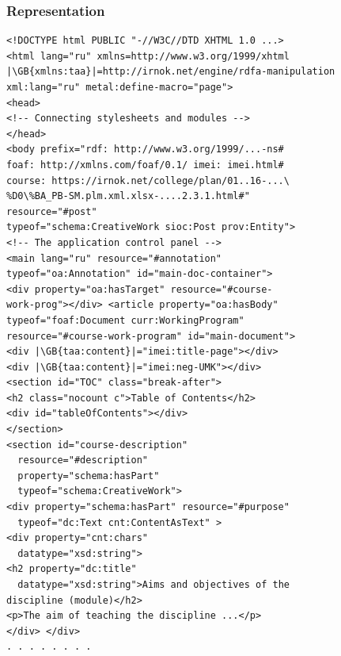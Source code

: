 \documentclass[10pt]{beamer}
\begin{document}
\begin{frame}
  \frametitle{Representation}

\newcommand{\GB}[1]{\colorbox{green}{#1}}
\newcommand{\BB}[1]{\colorbox{blue}{#1}}
\newcommand{\RB}[1]{\colorbox{red}{#1}}

\begin{verbatim}
<!DOCTYPE html PUBLIC "-//W3C//DTD XHTML 1.0 ...>
<html lang="ru" xmlns=http://www.w3.org/1999/xhtml
|\GB{xmlns:taa}|=http://irnok.net/engine/rdfa-manipulation
xml:lang="ru" metal:define-macro="page">
<head>
<!-- Connecting stylesheets and modules -->
</head>
<body prefix="rdf: http://www.w3.org/1999/...-ns#
foaf: http://xmlns.com/foaf/0.1/ imei: imei.html#
course: https://irnok.net/college/plan/01..16-...\
%D0\%BA_PB-SM.plm.xml.xlsx-....2.3.1.html#"
resource="#post"
typeof="schema:CreativeWork sioc:Post prov:Entity">
<!-- The application control panel -->
<main lang="ru" resource="#annotation"
typeof="oa:Annotation" id="main-doc-container">
<div property="oa:hasTarget" resource="#course-
work-prog"></div> <article property="oa:hasBody"
typeof="foaf:Document curr:WorkingProgram"
resource="#course-work-program" id="main-document">
<div |\GB{taa:content}|="imei:title-page"></div>
<div |\GB{taa:content}|="imei:neg-UMK"></div>
<section id="TOC" class="break-after">
<h2 class="nocount c">Table of Contents</h2>
<div id="tableOfContents"></div>
</section>
<section id="course-description"
  resource="#description"
  property="schema:hasPart"
  typeof="schema:CreativeWork">
<div property="schema:hasPart" resource="#purpose"
  typeof="dc:Text cnt:ContentAsText" >
<div property="cnt:chars"
  datatype="xsd:string">
<h2 property="dc:title"
  datatype="xsd:string">Aims and objectives of the
discipline (module)</h2>
<p>The aim of teaching the discipline ...</p>
</div> </div>
. . . . . . . .
\end{verbatim}
\end{frame}
\end{document}
